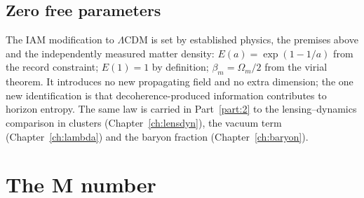 \subsection{Zero free parameters}
The IAM modification to $\Lambda$CDM is set by established physics, the premises above and the independently measured matter
density: $E(a)=\exp(1-1/a)$ from the record constraint; $E(1)=1$ by definition; $\beta_m=\Omega_m/2$ from the virial theorem. It introduces no new
propagating field and no extra dimension; the one new identification is that decoherence-produced information contributes to horizon entropy. The same law
is carried in Part~\ref{part:2} to the lensing--dynamics comparison in clusters (Chapter~\ref{ch:lensdyn}), the vacuum term (Chapter~\ref{ch:lambda}) and the
baryon fraction (Chapter~\ref{ch:baryon}).

\section{The M number}

